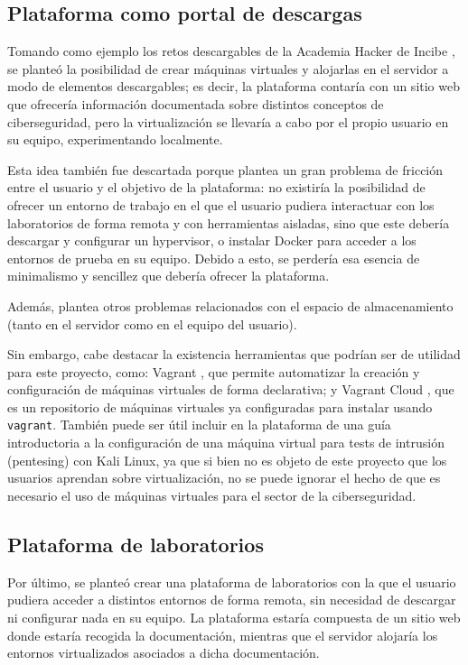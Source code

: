         
        \subsection{Plataforma como portal de descargas}

            Tomando como ejemplo los retos descargables de la Academia Hacker de Incibe \cite{retos-INCIBE}, se planteó la posibilidad de crear máquinas virtuales y alojarlas en el servidor a modo de elementos descargables; es decir, la plataforma contaría con un sitio web que ofrecería información documentada sobre distintos conceptos de ciberseguridad, pero la virtualización se llevaría a cabo por el propio usuario en su equipo, experimentando localmente.

            Esta idea también fue descartada porque plantea un gran problema de fricción entre el usuario y el objetivo de la plataforma: no existiría la posibilidad de ofrecer un entorno de trabajo en el que el usuario pudiera interactuar con los laboratorios de forma remota y con herramientas aisladas, sino que este debería descargar y configurar un hypervisor, o instalar Docker para acceder a los entornos de prueba en su equipo. Debido a esto, se perdería esa esencia de minimalismo y sencillez que debería ofrecer la plataforma.
            
            Además, plantea otros problemas relacionados con el espacio de almacenamiento (tanto en el servidor como en el equipo del usuario).

            Sin embargo, cabe destacar la existencia herramientas que podrían ser de utilidad para este proyecto, como: Vagrant \cite{vagrant}, que permite automatizar la creación y configuración de máquinas virtuales de forma declarativa; y Vagrant Cloud \cite{vagrant-cloud}, que es un repositorio de máquinas virtuales ya configuradas para instalar usando \texttt{vagrant}. También puede ser útil incluir en la plataforma de una guía introductoria a la configuración de una máquina virtual para tests de intrusión (pentesing) con Kali Linux, ya que si bien no es objeto de este proyecto que los usuarios aprendan sobre virtualización, no se puede ignorar el hecho de que es necesario el uso de máquinas virtuales para el sector de la ciberseguridad.

        
        \subsection{Plataforma de laboratorios}

            Por último, se planteó crear una plataforma de laboratorios con la que el usuario pudiera acceder a distintos entornos de forma remota, sin necesidad de descargar ni configurar nada en su equipo. La plataforma estaría compuesta de un sitio web donde estaría recogida la documentación, mientras que el servidor alojaría los entornos virtualizados asociados a dicha documentación.
            
